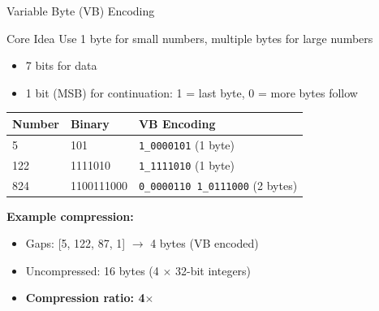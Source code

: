 \documentclass[aspectratio=169]{beamer}
\newif\ifanimated
\newcommand{\cpause}{\ifanimated\pause\fi}
\begin{document}
\begin{frame}[shrink=10]{Variable Byte (VB) Encoding}
\begin{block}{Core Idea}
Use 1 byte for small numbers, multiple bytes for large numbers
\begin{itemize}
    \item 7 bits for data
    \item 1 bit (MSB) for continuation: 1 = last byte, 0 = more bytes follow
\end{itemize}
\end{block}
\cpause

\vspace{1em}

\begin{table}
\centering
\begin{tabular}{lll}
\toprule
\textbf{Number} & \textbf{Binary} & \textbf{VB Encoding} \\
\midrule
5 & 101 & \texttt{1\_0000101} (1 byte) \\
122 & 1111010 & \texttt{1\_1111010} (1 byte) \\
824 & 1100111000 & \texttt{0\_0000110 1\_0111000} (2 bytes) \\
\bottomrule
\end{tabular}
\end{table}

\vspace{1em}

\textbf{Example compression:}
\begin{itemize}
    \item Gaps: [5, 122, 87, 1] $\rightarrow$ 4 bytes (VB encoded)
    \item Uncompressed: 16 bytes (4 $\times$ 32-bit integers)
    \item \textbf{Compression ratio: 4$\times$}
\end{itemize}
\end{frame}
\end{document}

